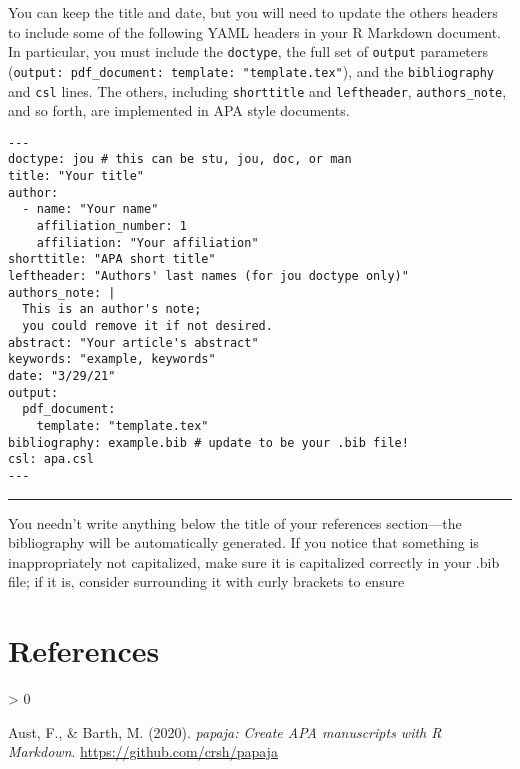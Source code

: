 \documentclass[jou]{apa7}
\newlength{\cslhangindent}
\newenvironment{CSLReferences}[2] %
 {%
  \setlength{\parindent}{0pt}
  \ifodd #1 \everypar{\setlength{\hangindent}{\cslhangindent}}\ignorespaces\fi
  \ifnum #2 > 0
  \setlength{\parskip}{#2\baselineskip}
  \fi
 }%
 {}
\begin{document}
You can keep the title and date, but you will need to update the others
headers to include some of the following YAML headers in your R Markdown
document. In particular, you must include the \texttt{doctype}, the full
set of \texttt{output} parameters
(\texttt{output:\ pdf\_document:\ template:\ "template.tex"}), and the
\texttt{bibliography} and \texttt{csl} lines. The others, including
\texttt{shorttitle} and \texttt{leftheader}, \texttt{authors\_note}, and
so forth, are implemented in APA style documents.

\begin{verbatim}
---
doctype: jou # this can be stu, jou, doc, or man
title: "Your title"
author: 
  - name: "Your name"
    affiliation_number: 1
    affiliation: "Your affiliation"
shorttitle: "APA short title"
leftheader: "Authors' last names (for jou doctype only)"
authors_note: |
  This is an author's note; 
  you could remove it if not desired. 
abstract: "Your article's abstract"
keywords: "example, keywords"
date: "3/29/21"
output: 
  pdf_document:
    template: "template.tex"
bibliography: example.bib # update to be your .bib file!
csl: apa.csl
---
\end{verbatim}

\begin{center}\rule{0.5\linewidth}{0.5pt}\end{center}

You needn't write anything below the title of your references
section---the bibliography will be automatically generated. If you
notice that something is inappropriately not capitalized, make sure it
is capitalized correctly in your .bib file; if it is, consider
surrounding it with curly brackets to ensure

\hypertarget{references}{%
\section*{References}\label{references}}

\hypertarget{refs}{}
\begin{CSLReferences}{1}{0}
\leavevmode\hypertarget{ref-austbarth2020}{}%
Aust, F., \& Barth, M. (2020). \emph{{papaja}: {Create} {APA}
manuscripts with {R Markdown}}. \url{https://github.com/crsh/papaja}

\end{CSLReferences}
\end{document}

